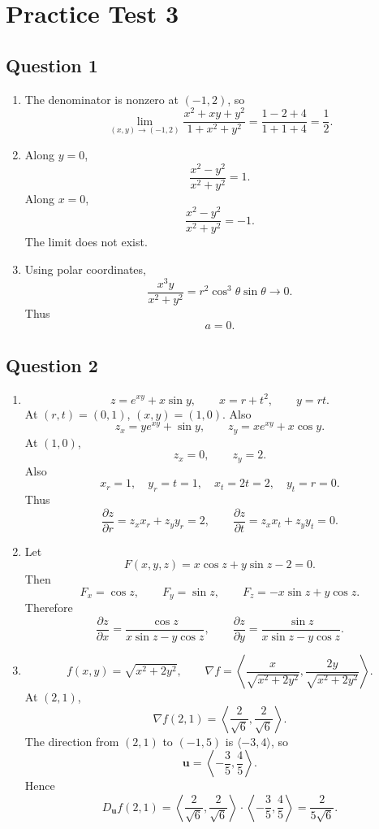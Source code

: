 \documentclass[11pt]{article}
\begin{document}
\section*{Practice Test 3}

\subsection*{Question 1}
\begin{enumerate}[label=\alph*)]
\item
The denominator is nonzero at $(-1,2)$, so
\[
\lim_{(x,y)\to(-1,2)}
\frac{x^2+xy+y^2}{1+x^2+y^2}
=\frac{1-2+4}{1+1+4}
=\boxed{\frac12}.
\]

\item
Along $y=0$,
\[
\frac{x^2-y^2}{x^2+y^2}=1.
\]
Along $x=0$,
\[
\frac{x^2-y^2}{x^2+y^2}=-1.
\]
The limit does not exist.

\item
Using polar coordinates,
\[
\frac{x^3y}{x^2+y^2}
=r^2\cos^3\theta\sin\theta \to 0.
\]
Thus
\[
\boxed{a=0}.
\]
\end{enumerate}

\subsection*{Question 2}
\begin{enumerate}[label=\alph*)]
\item
\[
z=e^{xy}+x\sin y,\qquad x=r+t^2,\qquad y=rt.
\]
At $(r,t)=(0,1)$, $(x,y)=(1,0)$. Also
\[
z_x=ye^{xy}+\sin y,\qquad z_y=xe^{xy}+x\cos y.
\]
At $(1,0)$,
\[
z_x=0,\qquad z_y=2.
\]
Also
\[
x_r=1,\quad y_r=t=1,\quad x_t=2t=2,\quad y_t=r=0.
\]
Thus
\[
\boxed{\frac{\partial z}{\partial r}=z_xx_r+z_yy_r=2},
\qquad
\boxed{\frac{\partial z}{\partial t}=z_xx_t+z_yy_t=0}.
\]

\item
Let
\[
F(x,y,z)=x\cos z+y\sin z-2=0.
\]
Then
\[
F_x=\cos z,\qquad F_y=\sin z,\qquad F_z=-x\sin z+y\cos z.
\]
Therefore
\[
\boxed{\frac{\partial z}{\partial x}=\frac{\cos z}{x\sin z-y\cos z}},
\qquad
\boxed{\frac{\partial z}{\partial y}=\frac{\sin z}{x\sin z-y\cos z}}.
\]

\item
\[
f(x,y)=\sqrt{x^2+2y^2},
\qquad
\nabla f=\left\langle \frac{x}{\sqrt{x^2+2y^2}},
\frac{2y}{\sqrt{x^2+2y^2}}\right\rangle.
\]
At $(2,1)$,
\[
\nabla f(2,1)=\left\langle \frac2{\sqrt6},\frac2{\sqrt6}\right\rangle.
\]
The direction from $(2,1)$ to $(-1,5)$ is $\langle -3,4\rangle$, so
\[
\mathbf u=\left\langle -\frac35,\frac45\right\rangle.
\]
Hence
\[
D_{\mathbf u}f(2,1)
=\left\langle \frac2{\sqrt6},\frac2{\sqrt6}\right\rangle
\cdot
\left\langle -\frac35,\frac45\right\rangle
=\boxed{\frac{2}{5\sqrt6}}.
\]
\end{enumerate}
\end{document}
